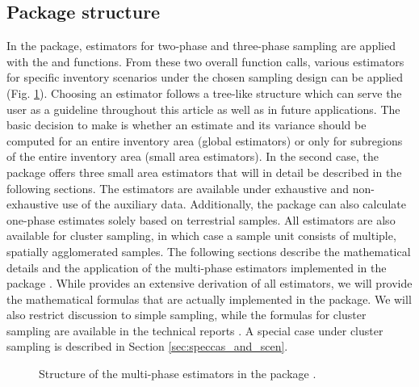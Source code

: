
\subsection{Package structure}
\label{sec:packstruc}

In the  package, estimators for two-phase and three-phase sampling are applied with the  and  functions. From these two overall function calls, various estimators for specific inventory scenarios under the chosen sampling design can be applied (Fig. \ref{fig:struct_package}). Choosing an estimator follows a tree-like structure which can serve the user as a guideline throughout this article as well as in future applications. The basic decision to make is whether an estimate and its variance should be computed for an entire inventory area (global estimators) or only for subregions of the entire inventory area (small area estimators). In the second case, the package offers three small area estimators that will in detail be described in the following sections. The estimators are available under exhaustive and non-exhaustive use of the auxiliary data. Additionally, the package can also calculate one-phase estimates solely based on terrestrial samples. All estimators are also available for cluster sampling, in which case a sample unit consists of multiple, spatially agglomerated samples. The following sections describe the mathematical details and the application of the multi-phase estimators implemented in the  package . While \cite{mandallaz2008, mandallaz2013techa, mandallaz2013techb,mandallaz2015tech} provides an extensive derivation of all estimators, we will provide the mathematical formulas that are actually implemented in the package. We will also restrict discussion to simple sampling, while the formulas for cluster sampling are available in the technical reports \citep{mandallaz2016, mandallaz2013techa, mandallaz2013techb}. A special case under cluster sampling is described in Section \ref{sec:speccas_and_scen}.

\begin{figure}[htb]
\centering
{}
\caption{Structure of the multi-phase estimators in the  package .}
\label{fig:struct_package}
\end{figure}

